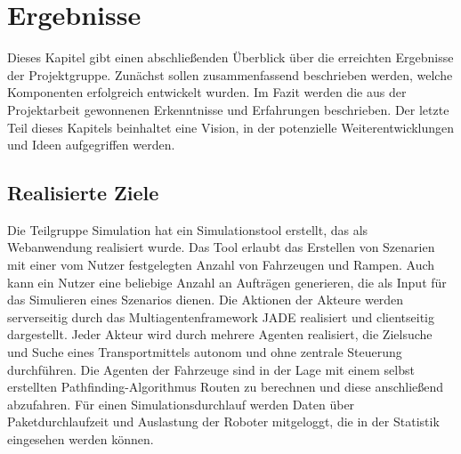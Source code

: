 \section{Ergebnisse}
Dieses Kapitel gibt einen abschließenden Überblick über die erreichten Ergebnisse der Projektgruppe. Zunächst sollen zusammenfassend beschrieben werden, welche Komponenten erfolgreich entwickelt wurden. Im Fazit werden die aus der Projektarbeit gewonnenen Erkenntnisse und Erfahrungen beschrieben. Der letzte Teil dieses Kapitels beinhaltet eine Vision, in der potenzielle Weiterentwicklungen und Ideen aufgegriffen werden. 

\subsection{Realisierte Ziele}

Die Teilgruppe Simulation hat ein Simulationstool erstellt, das als Webanwendung realisiert wurde. Das Tool erlaubt das Erstellen von Szenarien mit einer vom Nutzer festgelegten Anzahl von Fahrzeugen und Rampen. Auch kann ein Nutzer eine beliebige Anzahl an Aufträgen generieren, die als Input für das Simulieren eines Szenarios dienen. Die Aktionen der Akteure werden serverseitig durch das Multiagentenframework JADE realisiert und clientseitig dargestellt. Jeder Akteur wird durch mehrere Agenten realisiert, die Zielsuche und Suche eines Transportmittels autonom und ohne zentrale Steuerung durchführen. Die Agenten der Fahrzeuge sind in der Lage mit einem selbst erstellten Pathfinding-Algorithmus Routen zu berechnen und diese anschließend abzufahren. Für einen Simulationsdurchlauf werden Daten über Paketdurchlaufzeit und Auslastung der Roboter mitgeloggt, die in der Statistik eingesehen werden können.

